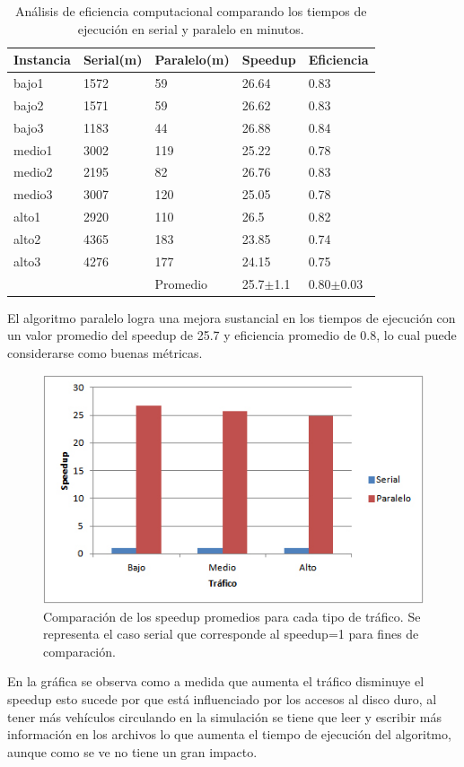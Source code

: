 \begin{table}[H]
	\renewcommand{\arraystretch}{1.2}
	\caption{Análisis de eficiencia computacional comparando los tiempos de ejecución en serial y paralelo en minutos. }
	\label{table:analisis_speedup}
	\centering
	\begin{tabular}{p{2.5cm}p{2.5cm}p{2.5cm}p{2.5cm}p{2.5cm} }
		\hline
		
		Instancia& 
		Serial(m) & 
		Paralelo(m) &
		Speedup &
		Eficiencia
		\\ 
		\hline
		bajo1  & 1572 & 59 & 26.64 & 0.83\\
		bajo2  & 1571 & 59 & 26.62 & 0.83\\
		bajo3  & 1183 & 44 & 26.88 & 0.84\\
		
		medio1  & 3002 & 119 & 25.22 & 0.78\\
		medio2  & 2195 & 82 & 26.76 & 0.83\\
		medio3  & 3007 & 120 & 25.05 & 0.78\\
		
		alto1  & 2920 & 110 & 26.5 & 0.82\\
		alto2  & 4365 & 183 & 23.85 & 0.74\\
		alto3  & 4276 & 177 & 24.15 & 0.75\\
		\hline
		  &  & Promedio & 25.7$\pm$1.1 & 0.80$\pm$0.03\\
		
		\hline
	\end{tabular}
\end{table}


El algoritmo paralelo logra una mejora sustancial en los tiempos de ejecución con un valor promedio del speedup de 25.7  y  eficiencia promedio de 0.8, lo cual puede considerarse como buenas métricas.

\begin{figure}[H]
	\centering
	\includegraphics[width=0.8\linewidth]{Figures/speedup1}
	\caption{Comparación de los speedup promedios para cada tipo de tráfico. Se representa el caso serial que corresponde al speedup=1 para fines de comparación.}
	\label{fig:speedup1}
\end{figure}

En la gráfica se observa como a medida que aumenta el tráfico disminuye el speedup esto sucede por que está influenciado por los accesos al disco duro, al tener más vehículos circulando en la simulación se tiene que leer y escribir más información en los archivos lo que aumenta el tiempo de ejecución del algoritmo, aunque como se ve no tiene un gran impacto.